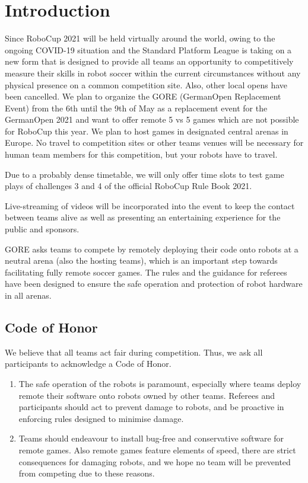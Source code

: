 \section{Introduction}

Since RoboCup 2021 will be held virtually around the world, owing to the ongoing COVID-19 situation and the Standard Platform League is taking on a new form that is designed to provide all teams an opportunity to competitively measure their skills in robot soccer within the current circumstances without any physical presence on a common competition site. Also, other local opens have been cancelled.
We plan to organize the GORE (GermanOpen Replacement Event) from the 6th until the 9th of May as a replacement event for the GermanOpen 2021 and want to offer remote 5 vs 5 games which are not possible for RoboCup this year. We plan to host games in designated central arenas in Europe. 
No travel to competition sites or other teams venues will be necessary for human team members for this competition, but your robots have to travel.

Due to a probably dense timetable, we will only offer time slots to test game plays of challenges 3 and 4 of the official RoboCup Rule Book 2021. 

Live-streaming of videos will be incorporated into the event to keep the contact between teams alive as well as presenting an entertaining experience for the public and sponsors.

GORE asks teams to compete by remotely deploying their code onto robots at a neutral arena (also the hosting teams), which is an important step towards facilitating fully remote soccer games. The rules and the guidance for referees have been designed to ensure the safe operation and protection of robot hardware in all arenas.

\subsection{Code of Honor}

We believe that all teams act fair during competition. Thus, we ask all participants to acknowledge a Code of Honor.
\begin{enumerate}
    \item The safe operation of the robots is paramount, especially where teams deploy remote their software onto robots owned by other teams. Referees and participants should act to prevent damage to robots, and be proactive in enforcing rules  designed to minimise damage.
    \item Teams should endeavour to install bug-free and conservative software for remote games. Also remote games feature elements of speed, there are strict consequences for damaging robots, and we hope no team will be prevented from competing due to these reasons.
\end{enumerate} 

